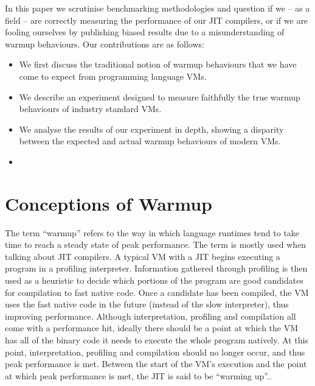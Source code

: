 \documentclass[10pt,preprint]{sigplanconf}
\begin{document}
In this paper we scrutinise benchmarking methodologies and question if we --
as a field -- are correctly measuring the performance of our JIT compilers,
or if we are fooling ourselves by publishing biased results due to a
misunderstanding of warmup behaviours. Our contributions are as follows:

\begin{itemize}
\item We first discuss the traditional notion of warmup behaviours that we have
come to expect from programming language VMs.
\item We describe an experiment designed to measure faithfully the true
warmup behaviours of industry standard VMs.
\item We analyse the results of our experiment in depth, showing a disparity
between the expected and actual warmup behaviours of modern VMs.
\item {}
\end{itemize}


\section{Conceptions of Warmup}
\label{sec:warmup}

The term ``warmup'' refers to the way in which language runtimes tend to take
time to reach a steady state of peak performance. The term is mostly used when
talking about JIT compilers. A typical VM
with a JIT begins executing a program in a profiling interpreter. Information
gathered through profiling is then used as a heuristic to decide which portions
of the program are good candidates for compilation to fast native code. Once a
candidate has been compiled, the VM uses the fast native code in the future
(instead of the slow interpreter), thus improving performance.  Although
interpretation, profiling and compilation all come with a performance hit,
ideally there should be a point at which the VM has all of the binary code it
needs to execute the whole program natively. At this point, interpretation,
profiling and compilation should no longer occur, and thus peak performance is
met. Between the start of the VM's execution and the point at which peak
performance is met, the JIT is said to be ``warming up''..
\end{document}
